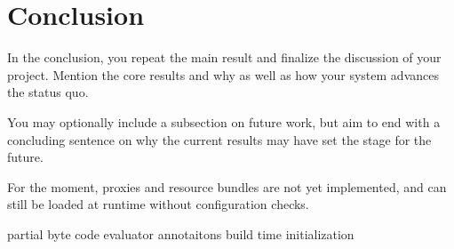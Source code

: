 \chapter{Conclusion}

In the conclusion, you repeat the main result and finalize the discussion of
your project. Mention the core results and why as well as how your system
advances the status quo.

You may optionally include a subsection on future work, but aim to end with a concluding sentence on why the current results may have set the stage for the future.


For the moment, proxies and resource bundles are not yet implemented, and can still be loaded at runtime without configuration checks.

partial byte code evaluator
annotaitons
build time initialization
